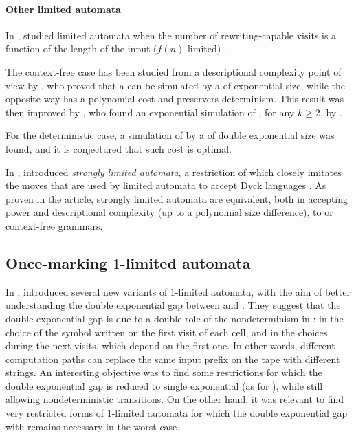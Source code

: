 \paragraph{Other limited automata}
In \citeyear{WecBra79}, \citeauthor{WecBra79} studied limited automata when the number of rewriting-capable visits is a function of the length of the input ($f(n)$-limited) \cite{WecBra79}.

The context-free case has been studied from a descriptional complexity point of view by \citeauthor{PigPis15}, who proved that a  can be simulated by a \PDA of exponential size, while the opposite way has a polynomial cost and preservers determinism.
This result was then improved by \cite{KutPig+18}, who found an exponential simulation of \kLA, for any $k\ge2$, by \PDA \cite{KutPig+18}.

For the deterministic case, a simulation of  by a \DPDA of double exponential size was found, and it is conjectured that such cost is optimal.

In \citeyear{Pig16}, \citeauthor{Pig16} introduced \emph{strongly limited automata}, a restriction of  which closely imitates the moves that are used by limited automata to accept Dyck languages \cite{Pig16}.
As proven in the article, strongly limited automata are equivalent, both in accepting power and descriptional complexity (up to a polynomial size difference), to \PDAs or context-free grammars.


\subsection{Once-marking \texorpdfstring{$1$}{1}-limited automata}
In \citeyear{PigPri23a}, \citeauthor{PigPri23a} introduced several new variants of $1$-limited automata, with the aim of better understanding the double exponential gap between \OLA and \ODFA \cite{PigPri23a}.
They suggest that the double exponential gap is due to a double role of the nondeterminism in \OLA: in the choice of the symbol written on the first visit of each cell, and in the choices during the next visits, which depend on the first one.
In other words, different computation paths can replace the same input prefix on the tape with different strings.
An interesting objective was to find some restrictions for which the double exponential gap is reduced to single exponential (as for \ODLA), while still allowing nondeterministic transitions.
On the other hand, it was relevant to find very restricted forms of $1$-limited automata for which the double exponential gap with \ODFA remains necessary in the worst case.

